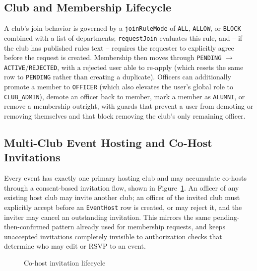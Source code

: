 \documentclass[12pt,oneside]{book}
\begin{document}
\subsection{Club and Membership Lifecycle}
A club's join behavior is governed by a \texttt{joinRuleMode} of \texttt{ALL}, \texttt{ALLOW}, or \texttt{BLOCK} combined with a list of departments; \texttt{requestJoin} evaluates this rule, and -- if the club has published rules text -- requires the requester to explicitly agree before the request is created. Membership then moves through \texttt{PENDING} $\rightarrow$ \texttt{ACTIVE}/\texttt{REJECTED}, with a rejected user able to re-apply (which resets the same row to \texttt{PENDING} rather than creating a duplicate). Officers can additionally promote a member to \texttt{OFFICER} (which also elevates the user's global role to \texttt{CLUB\_ADMIN}), demote an officer back to member, mark a member as \texttt{ALUMNI}, or remove a membership outright, with guards that prevent a user from demoting or removing themselves and that block removing the club's only remaining officer.

\subsection{Multi-Club Event Hosting and Co-Host Invitations}
Every event has exactly one primary hosting club and may accumulate co-hosts through a consent-based invitation flow, shown in Figure~\ref{fig:4.5}. An officer of any existing host club may invite another club; an officer of the invited club must explicitly accept before an \texttt{EventHost} row is created, or may reject it, and the inviter may cancel an outstanding invitation. This mirrors the same pending-then-confirmed pattern already used for membership requests, and keeps unaccepted invitations completely invisible to authorization checks that determine who may edit or RSVP to an event.

\begin{figure}[H]
\centering
{}
\caption{Co-host invitation lifecycle}
\label{fig:4.5}
\end{figure}
\end{document}
